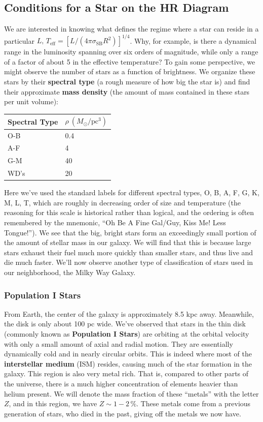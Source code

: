 \documentclass[10pt]{article}
\numberwithin{equation}{section}
\begin{document}
	\subsection{Conditions for a Star on the HR Diagram}
	We are interested in knowing what defines the regime where a star can 
reside in a particular $L,\,T_{\mathrm{eff}}=[L/(4\pi\sigma_{\mathrm{SB}}
R^2)]^{1/4}$. Why, for example, is there a dynamical range in the 
luminosity spanning over six orders of magnitude, while only a range of a 
factor of about 5 in the effective temperature? To gain some perspective, 
we might observe the number of stars as a function of brightness. We 
organize these stars by their \textbf{spectral type} (a rough measure of 
how big the star is) and find their approximate \textbf{mass density} (the 
amount of mass contained in these stars per unit volume):
	\begin{center} 
	\begin{tabular}{l l}
		Spectral Type & $\rho\ (M_\odot/\mathrm{pc^3})$\\
		\hline
		O-B & 0.4\\
		A-F & 4\\
		G-M & 40\\
		WD's & 20
	\end{tabular}
	\end{center}
	Here we've used the standard labels for different spectral types, O, B, 
A, F, G, K, M, L, T, which are roughly in decreasing order of size and 
temperature (the reasoning for this scale is historical rather than 
logical, and the ordering is often remembered by the mnemonic, ``Oh Be A 
Fine Gal/Guy, Kiss Me! Less Tongue!''). We see that the big, bright stars 
form an exceedingly small portion of the amount of stellar mass in our 
galaxy. We will find that this is because large stars exhaust their fuel 
much more quickly than smaller stars, and thus live and die much faster. 
We'll now observe another type of classification of stars used in our 
neighborhood, the Milky Way Galaxy.
		
	\subsubsection{Population I Stars}
	From Earth, the center of the galaxy is approximately 8.5 kpc away. 
Meanwhile, the disk is only about 100 pc wide.  We've observed that stars 
in the thin disk (commonly known as \textbf{Population I Stars}) are 
orbiting at the orbital velocity with only a small amount of axial and 
radial motion. They are essentially dynamically cold and in nearly circular 
orbits. This is indeed where most of the \textbf{interstellar medium} (ISM) 
resides, causing much of the star formation in the galaxy. This region is 
also very metal rich. That is, compared to other parts of the universe, 
there is a much higher concentration of elements heavier than helium 
present. We will denote the mass fraction of these ``metals'' with the 
letter $Z$, and in this region, we have $Z\sim 1-2\,\%$. These metals come 
from a previous generation of stars, who died in the past, giving off the 
metals we now have.	
	
\end{document}
